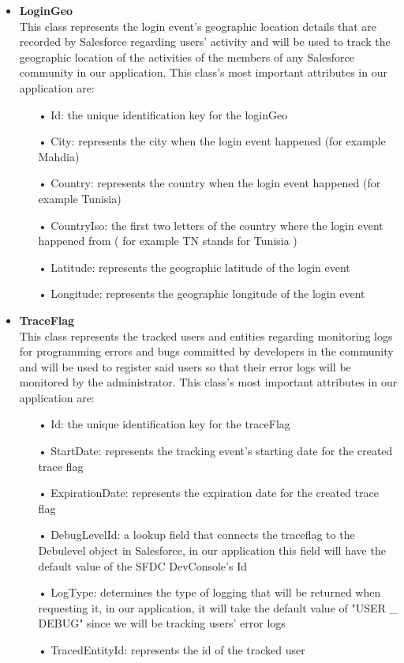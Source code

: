 \begin{itemize}
\begin{itemize}
\end{itemize}
\item \textbf{LoginGeo}\\
This class represents the login event's geographic location details that are recorded by Salesforce regarding users' activity and will be used to track the geographic location of the activities of the members of any Salesforce community in our application. This class's most important attributes in our application are:
\begin{itemize}
\item[•] Id: the unique identification key for the loginGeo
\item[•] City: represents the city when the login event happened (for example Mahdia)
\item[•] Country: represents the country when the login event happened (for example Tunisia)
\item[•] CountryIso: the first two letters of the country where the login event happened from ( for example TN stands for Tunisia )
\item[•] Latitude: represents the geographic latitude of the login event
\item[•] Longitude: represents the geographic longitude of the login event

\end{itemize}
\item \textbf{TraceFlag}\\
This class represents the tracked users and entities regarding monitoring logs for programming errors and bugs committed by developers in the community and will be used to register said users so that their error logs will be monitored by the administrator. This class's most important attributes in our application are:
\begin{itemize}
\item[•] Id: the unique identification key for the traceFlag
\item[•] StartDate: represents the tracking event's starting date for the created trace flag
\item[•] ExpirationDate: represents the expiration date for the created trace flag
\item[•] DebugLevelId: a lookup field that connects the traceflag to the Debulevel object in Salesforce, in our application this field will have the default value of the SFDC DevConsole's Id 
\item[•] LogType: determines the type of logging that will be returned when requesting it, in our application, it will take the default value of "USER \_ DEBUG" since we will be tracking users' error logs
\item[•] TracedEntityId: represents the id of the tracked user


\end{itemize}
\end{itemize}

